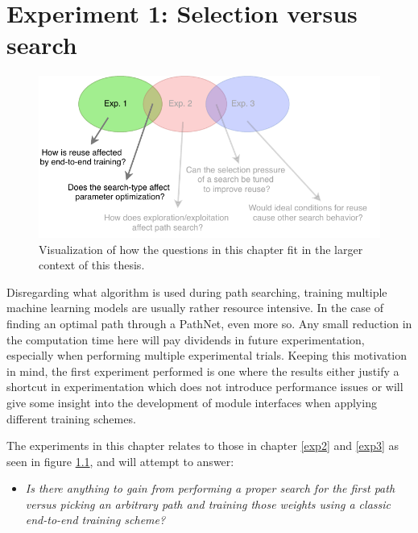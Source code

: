 \chapter{Experiment 1: Selection versus search}
\label{exp1}

\begin{figure}[ht]
    \includegraphics[width=\textwidth]{Chapters/4.Experiments/exp1/figures/exp1.pdf}
    \caption[Experiment focus]{Visualization of how the questions in this chapter fit in the larger context of this thesis.}
    \label{fig:exp1.questions}
\end{figure}
\noindent
Disregarding what algorithm is used during path searching, training multiple machine learning models are usually rather resource intensive. In the case of finding an optimal path through a PathNet, even more so. Any small reduction in the computation time here will pay dividends in future experimentation, especially when performing multiple experimental trials. Keeping this motivation in mind, the first experiment performed is one where the results either justify a shortcut in experimentation which does not introduce performance issues or will give some insight into the development of module interfaces when applying different training schemes.

The experiments in this chapter relates to those in chapter \ref{exp2} and \ref{exp3} as seen in figure \ref{fig:exp1.questions}, and will attempt to answer:
\begin{itemize}
    \item \emph{Is there anything to gain from performing a proper search for the first path versus picking an arbitrary path and training those weights using a classic end-to-end training scheme?}
\end{itemize}


